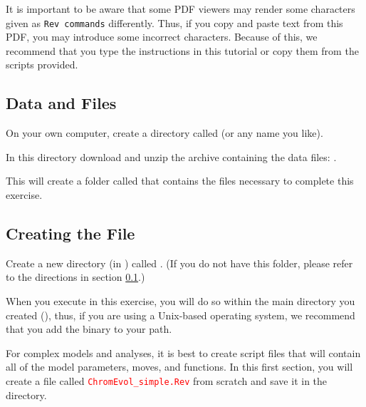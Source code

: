 It is important to be aware that some PDF viewers may render some characters given as \colorbox{shadecolor}{\tt{Rev commands}} differently. 
Thus, if you copy and paste text from this PDF, you may introduce some incorrect characters. 
Because of this, we recommend that you type the instructions in this tutorial or copy them from the scripts provided. 


\medskip
\subsection{Data and Files}\label{subsect:Exercise-DataFiles}

{\begin{framed}
On your own computer, create a directory called {\textcolor{red}{}} (or any name you like). 

In this directory download and unzip the archive containing the data files: \href{https://github.com/revbayes/revbayes_tutorial/tree/master/RB_Chromosome_Evolution_Tutorial/data.zip}{}.

This will create a folder called  that contains the files necessary to complete this exercise.

\end{framed}}


\bigskip
\subsection{Creating the \Rev File}\label{subsect:Exercise-CreatingFiles}

{\begin{framed}
Create a new directory (in ) called {\textcolor{red}{}}. (If you do not have this folder, please refer to the directions in section \ref{subsect:Exercise-DataFiles}.)
\end{framed}}

When you execute \RevBayes in this exercise, you will do so within the main directory you created (), thus, if you are using a Unix-based operating system, we recommend that you add the \RevBayes binary to your path.
\bigskip

For complex models and analyses, it is best to create \Rev script files that will contain all of the model parameters, moves, and functions. 
In this first section, you will create a file called \textcolor{red}{\texttt{ChromEvol\_simple.Rev}} from scratch and save it in the  directory.

